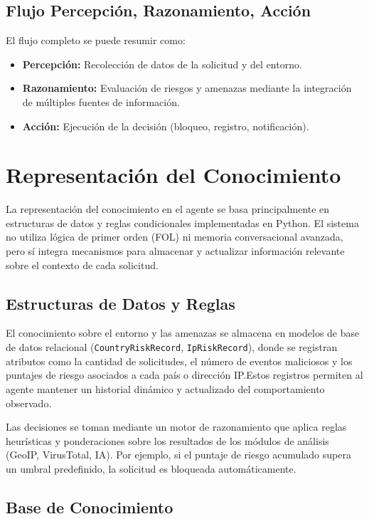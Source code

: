 \subsection{Flujo Percepción, Razonamiento, Acción}

El flujo completo se puede resumir como:

\begin{itemize}
    \item \textbf{Percepción:} Recolección de datos de la solicitud y del entorno.
    \item \textbf{Razonamiento:} Evaluación de riesgos y amenazas mediante la integración de múltiples fuentes de información.
    \item \textbf{Acción:} Ejecución de la decisión (bloqueo, registro, notificación).
\end{itemize}

\section{Representación del Conocimiento}

La representación del conocimiento en el agente se basa principalmente en estructuras de datos y reglas condicionales implementadas en Python. El sistema no utiliza lógica de primer orden (FOL) ni memoria conversacional avanzada, pero sí integra mecanismos para almacenar y actualizar información relevante sobre el contexto de cada solicitud.

\subsection{Estructuras de Datos y Reglas}

El conocimiento sobre el entorno y las amenazas se almacena en modelos de base de datos relacional (\texttt{CountryRiskRecord}, \texttt{IpRiskRecord}), donde se registran atributos como la cantidad de solicitudes, el número de eventos maliciosos y los puntajes de riesgo asociados a cada país o dirección IP.\@{}Estos registros permiten al agente mantener un historial dinámico y actualizado del comportamiento observado.

Las decisiones se toman mediante un motor de razonamiento que aplica reglas heurísticas y ponderaciones sobre los resultados de los módulos de análisis (GeoIP, VirusTotal, IA). Por ejemplo, si el puntaje de riesgo acumulado supera un umbral predefinido, la solicitud es bloqueada automáticamente.

\subsection{Base de Conocimiento}

